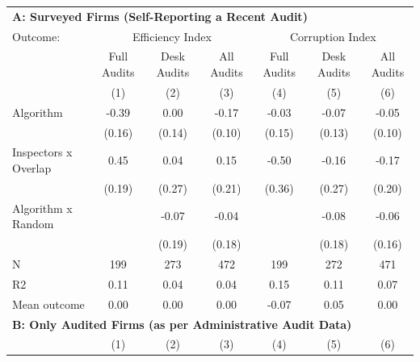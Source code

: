 \begin{tabular}{lccc|ccc} \toprule
\multicolumn{7}{l}{\textbf{A: Surveyed Firms (Self-Reporting a Recent Audit)}} \\ \multicolumn{1}{l}{Outcome:} & \multicolumn{3}{c}{Efficiency Index} & \multicolumn{3}{c}{Corruption Index} \\ \multicolumn{1}{l}{} & Full Audits & Desk Audits & All Audits & Full Audits & Desk Audits & All Audits \\ \multicolumn{1}{l}{} & (1) & (2) & (3) & (4) & (5) & (6) \\ \midrule
Algorithm   &       -0.39\sym{**} &        0.00         &       -0.17\sym{*}  &       -0.03         &       -0.07         &       -0.05         \\
            &      (0.16)         &      (0.14)         &      (0.10)         &      (0.15)         &      (0.13)         &      (0.10)         \\
\addlinespace
Inspectors x Overlap&        0.45\sym{**} &        0.04         &        0.15         &       -0.50         &       -0.16         &       -0.17         \\
            &      (0.19)         &      (0.27)         &      (0.21)         &      (0.36)         &      (0.27)         &      (0.20)         \\
\addlinespace
Algorithm x Random&                     &       -0.07         &       -0.04         &                     &       -0.08         &       -0.06         \\
            &                     &      (0.19)         &      (0.18)         &                     &      (0.18)         &      (0.16)         \\
\midrule
N           &         199         &         273         &         472         &         199         &         272         &         471         \\
R2          &        0.11         &        0.04         &        0.04         &        0.15         &        0.11         &        0.07         \\
Mean outcome&        0.00         &        0.00         &        0.00         &       -0.07         &        0.05         &        0.00         \\

\midrule \multicolumn{7}{l}{\textbf{B: Only Audited Firms (as per Administrative Audit Data)}} \\ \multicolumn{1}{l}{} & (1) & (2) & (3) & (4) & (5) & (6) \\ \midrule


\end{tabular}
